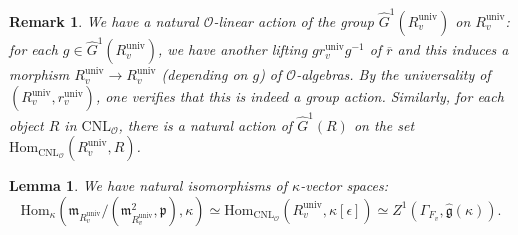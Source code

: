 \documentclass[12pt,oneside,reqno]{amsart}
\theoremstyle{plain}
\newtheorem{lemma}[theorem]{Lemma}
\newtheorem{remark}[theorem]{Remark}
\begin{document}
	
	
	
	
	
	
	
	\begin{remark}\label{group action on universal ring}\rm
		We have a natural
		$\mathcal{O}$-linear
		action of
		the group
		$\widehat{G}^1(R^\mathrm{univ}_v)$
		on $R^\mathrm{univ}_v$:
		for each
		$g\in
		\widehat{G}^1(R^\mathrm{univ}_v)$,
		we have another lifting
		$gr^\mathrm{univ}_vg^{-1}$
		of $\overline{r}$
		and this induces a morphism
		$R^\mathrm{univ}_v
		\rightarrow
		R^\mathrm{univ}_v$
		(depending on $g$)
		of
		$\mathcal{O}$-algebras.
		By the universality of
		$(R^\mathrm{univ}_v,r^\mathrm{univ}_v)$,
		one verifies that this is indeed a group action.
		Similarly,
		for each object
		$R$ in
		$\mathrm{CNL}_\mathcal{O}$,
		there is a natural
		action of
		$\widehat{G}^1(R)$
		on the set
		$\mathrm{Hom}_{\mathrm{CNL}_\mathcal{O}}
		(R^\mathrm{univ}_v,R)$.
	\end{remark}
	
	
	\begin{lemma}\label{isomorphisms of tangent spaces}
		We have natural isomorphisms of
		$\kappa$-vector spaces:
		\[
		\mathrm{Hom}_\kappa
		(\mathfrak{m}_{R^\mathrm{univ}_v}/
		(\mathfrak{m}_{R^\mathrm{univ}_v}^2,\mathfrak{p}),
		\kappa
		)
		\simeq
		\mathrm{Hom}_{\mathrm{CNL}_{\mathcal{O}}}
		(R^\mathrm{univ}_v,
		\kappa[\epsilon])
		\simeq
		Z^1(\Gamma_{F_v},
		\widehat{\mathfrak{g}}(\kappa)).
		\]
	\end{lemma}
	
	
	
\end{document}
